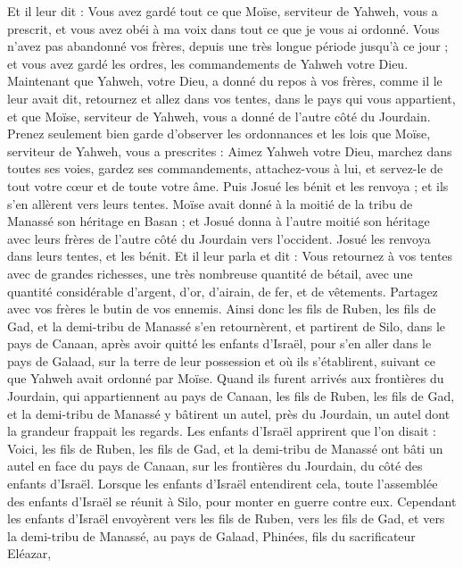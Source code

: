 \begin{multicols}{2}
Et il leur dit : Vous avez gardé tout ce que Moïse, serviteur de Yahweh, vous a prescrit, et vous avez obéi à ma voix dans tout ce que je vous ai ordonné.
Vous n'avez pas abandonné vos frères, depuis une très longue période jusqu'à ce jour ; et vous avez gardé les ordres, les commandements de Yahweh votre Dieu.
Maintenant que Yahweh, votre Dieu, a donné du repos à vos frères, comme il le leur avait dit, retournez et allez dans vos tentes, dans le pays qui vous appartient, et que Moïse, serviteur de Yahweh, vous a donné de l'autre côté du Jourdain.
Prenez seulement bien garde d'observer les ordonnances et les lois que Moïse, serviteur de Yahweh, vous a prescrites : Aimez Yahweh votre Dieu, marchez dans toutes ses voies, gardez ses commandements, attachez-vous à lui, et servez-le de tout votre cœur et de toute votre âme.
Puis Josué les bénit et les renvoya ; et ils s'en allèrent vers leurs tentes.
Moïse avait donné à la moitié de la tribu de Manassé son héritage en Basan ; et Josué donna à l'autre moitié son héritage avec leurs frères de l'autre côté du Jourdain vers l'occident. Josué les renvoya dans leurs tentes, et les bénit.
Et il leur parla et dit : Vous retournez à vos tentes avec de grandes richesses, une très nombreuse quantité de bétail, avec une quantité considérable d'argent, d'or, d'airain, de fer, et de vêtements. Partagez avec vos frères le butin de vos ennemis.
Ainsi donc les fils de Ruben, les fils de Gad, et la demi-tribu de Manassé s'en retournèrent, et partirent de Silo, dans le pays de Canaan, après avoir quitté les enfants d'Israël, pour s'en aller dans le pays de Galaad, sur la terre de leur possession et où ils s'établirent, suivant ce que Yahweh avait ordonné par Moïse.
Quand ils furent arrivés aux frontières du Jourdain, qui appartiennent au pays de Canaan, les fils de Ruben, les fils de Gad, et la demi-tribu de Manassé y bâtirent un autel, près du Jourdain, un autel dont la grandeur frappait les regards.
Les enfants d'Israël apprirent que l'on disait : Voici, les fils de Ruben, les fils de Gad, et la demi-tribu de Manassé ont bâti un autel en face du pays de Canaan, sur les frontières du Jourdain, du côté des enfants d'Israël.
Lorsque les enfants d'Israël entendirent cela, toute l'assemblée des enfants d'Israël se réunit à Silo, pour monter en guerre contre eux.
Cependant les enfants d'Israël envoyèrent vers les fils de Ruben, vers les fils de Gad, et vers la demi-tribu de Manassé, au pays de Galaad, Phinées, fils du sacrificateur Eléazar,

\end{multicols}

